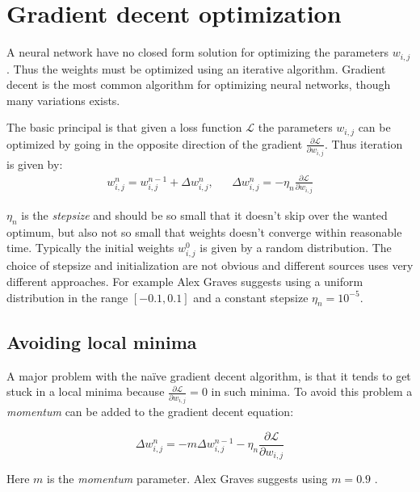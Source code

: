 
\section{Gradient decent optimization}

A neural network have no closed form solution for optimizing the parameters $w_{i,j}$. Thus the weights must be optimized using an iterative algorithm. Gradient decent is the most common algorithm for optimizing neural networks, though many variations exists.

The basic principal is that given a loss function $\mathcal{L}$ the parameters $w_{i,j}$ can be optimized by going in the opposite direction of the gradient $\frac{\partial \mathcal{L}}{\partial w_{i,j}}$. Thus iteration is given by:
\begin{equation}
\begin{aligned}
w_{i,j}^n = w_{i,j}^{n-1} + \Delta w_{i,j}^n, && \Delta w_{i,j}^n = - \eta_n \frac{\partial \mathcal{L}}{\partial w_{i,j}}
\end{aligned}
\end{equation}

$\eta_n$ is the \textit{stepsize} and should be so small that it doesn't skip over the wanted optimum, but also not so small that weights doesn't converge within reasonable time. Typically the initial weights $w^0_{i,j}$ is given by a random distribution. The choice of stepsize and initialization are not obvious and different sources uses very different approaches. For example Alex Graves \cite{alexgraves} suggests using a uniform distribution in the range $[-0.1, 0.1]$ and a constant stepsize $\eta_n = 10^{-5}$.

\subsection{Avoiding local minima}

A major problem with the naïve gradient decent algorithm, is that it tends to get stuck in a local minima because $\frac{\partial \mathcal{L}}{\partial w_{i,j}} = 0$ in such minima. To avoid this problem a \textit{momentum} can be added to the gradient decent equation:

\begin{equation}
\Delta w_{i,j}^n = - m \Delta w_{i,j}^{n-1} - \eta_n \frac{\partial \mathcal{L}}{\partial w_{i,j}}
\end{equation}

Here $m$ is the \textit{momentum} parameter. Alex Graves suggests using $m = 0.9$ \cite{alexgraves}.

